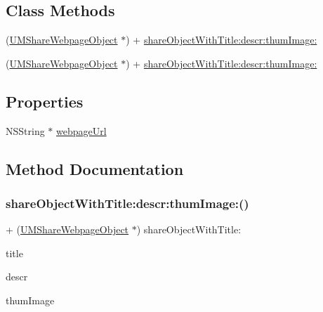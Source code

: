 \subsection*{Class Methods}
\begin{DoxyCompactItemize}
\item 
(\mbox{\hyperlink{interface_u_m_share_webpage_object}{U\+M\+Share\+Webpage\+Object}} $\ast$) + \mbox{\hyperlink{interface_u_m_share_webpage_object_af65beeae70fdb90213c4e458256b8c7c}{share\+Object\+With\+Title\+:descr\+:thum\+Image\+:}}
\item 
(\mbox{\hyperlink{interface_u_m_share_webpage_object}{U\+M\+Share\+Webpage\+Object}} $\ast$) + \mbox{\hyperlink{interface_u_m_share_webpage_object_af65beeae70fdb90213c4e458256b8c7c}{share\+Object\+With\+Title\+:descr\+:thum\+Image\+:}}
\end{DoxyCompactItemize}
\subsection*{Properties}
\begin{DoxyCompactItemize}
\item 
N\+S\+String $\ast$ \mbox{\hyperlink{interface_u_m_share_webpage_object_adcb99eee3c1e05fa78a8e63af8d15eac}{webpage\+Url}}
\end{DoxyCompactItemize}


\subsection{Method Documentation}
\mbox{\label{interface_u_m_share_webpage_object_af65beeae70fdb90213c4e458256b8c7c}} 
\subsubsection{\texorpdfstring{share\+Object\+With\+Title\+:descr\+:thum\+Image\+:()}{shareObjectWithTitle:descr:thumImage:()}\hspace{0.1cm}{\footnotesize\ttfamily [1/2]}}
{\footnotesize\ttfamily + (\mbox{\hyperlink{interface_u_m_share_webpage_object}{U\+M\+Share\+Webpage\+Object}} $\ast$) share\+Object\+With\+Title\+: \begin{DoxyParamCaption}\item[{(N\+S\+String $\ast$)}]{title }\item[{descr:(N\+S\+String $\ast$)}]{descr }\item[{thumImage:(id)}]{thum\+Image }\end{DoxyParamCaption}}


